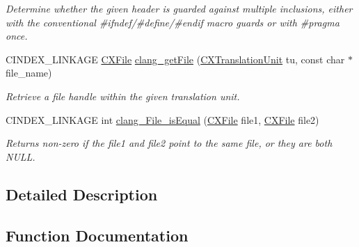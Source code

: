\begin{DoxyCompactItemize}
\begin{DoxyCompactList}\small\item\em Determine whether the given header is guarded against multiple inclusions, either with the conventional \#ifndef/\#define/\#endif macro guards or with \#pragma once. \end{DoxyCompactList}\item 
C\+I\+N\+D\+E\+X\+\_\+\+L\+I\+N\+K\+A\+GE \hyperlink{group__CINDEX__FILES_gacfcea9c1239c916597e2e5b3e109215a}{C\+X\+File} \hyperlink{group__CINDEX__FILES_gaa0554e2ea48ecd217a29314d3cbd2085}{clang\+\_\+get\+File} (\hyperlink{group__CINDEX_gacdb7815736ca709ce9a5e1ec2b7e16ac}{C\+X\+Translation\+Unit} tu, const char $\ast$file\+\_\+name)
\begin{DoxyCompactList}\small\item\em Retrieve a file handle within the given translation unit. \end{DoxyCompactList}\item 
\mbox{\label{group__CINDEX__FILES_gab78e940d8990228d941a79750a7e4499}} 
C\+I\+N\+D\+E\+X\+\_\+\+L\+I\+N\+K\+A\+GE int \hyperlink{group__CINDEX__FILES_gab78e940d8990228d941a79750a7e4499}{clang\+\_\+\+File\+\_\+is\+Equal} (\hyperlink{group__CINDEX__FILES_gacfcea9c1239c916597e2e5b3e109215a}{C\+X\+File} file1, \hyperlink{group__CINDEX__FILES_gacfcea9c1239c916597e2e5b3e109215a}{C\+X\+File} file2)
\begin{DoxyCompactList}\small\item\em Returns non-\/zero if the {\ttfamily file1} and {\ttfamily file2} point to the same file, or they are both N\+U\+LL. \end{DoxyCompactList}\end{DoxyCompactItemize}


\subsection{Detailed Description}


\subsection{Function Documentation}
\mbox{\label{group__CINDEX__FILES_gaa0554e2ea48ecd217a29314d3cbd2085}} 
